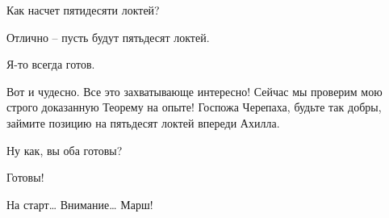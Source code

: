\documentclass[../main.tex]{subfiles}
\begin{document}
\begin{Dialogue}
 Как насчет пятидесяти локтей?

 Отлично \--- пусть будут пятьдесят локтей.

 Я-то всегда готов.

 Вот и чудесно. Все это захватывающе интересно! Сейчас мы проверим мою строго доказанную Теорему на опыте! Госпожа Черепаха, будьте так добры, займите позицию на пятьдесят локтей впереди Ахилла.


Ну как, вы оба готовы?

 Готовы!

 На старт\ldots{} Внимание\ldots{} Марш!

\end{Dialogue}
\end{document}
